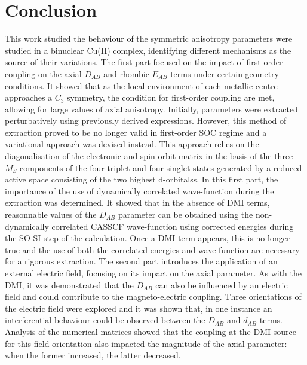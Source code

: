 \documentclass[12pt]{report}
\numberwithin{equation}{section}
\begin{document}
\newpage
\section{Conclusion}

This work studied the behaviour of the symmetric anisotropy parameters were studied in a binuclear Cu(II) complex, identifying different mechanisms as the source of their variations.
The first part focused on the impact of first-order coupling on the axial $D_{AB}$ and rhombic $E_{AB}$ terms under certain geometry conditions.
It showed that as the local environment of each metallic centre approaches a $C_3$ symmetry, the condition for first-order coupling are met, allowing for large values of axial anisotropy.
Initially,  parameters were extracted perturbatively using previously derived expressions. 
However, this method of extraction proved to be no longer valid in first-order SOC regime and a variational approach was devised instead.
This approach relies on the diagonalisation of the electronic and spin-orbit matrix in the basis of the three $M_S$ components of the four triplet and four singlet states generated by a reduced active space consisting of the two highest d-orbitalss.
In this first part, the importance of the use of dynamically correlated wave-function during the extraction was determined.
It showed that in the absence of DMI terms, reasonnable values of the $D_{AB}$ parameter can be obtained using the non-dynamically correlated CASSCF wave-function using corrected energies during the SO-SI step of the calculation.
Once a DMI term appears, this is no longer true and the use of both the correlated energies and wave-function are necessary for a rigorous extraction.
The second part introduces the application of an external electric field, focusing on its impact on the axial parameter.
As with the DMI, it was demonstrated that the $D_{AB}$ can also be influenced by an electric field and could contribute to the magneto-electric coupling.
Three orientations of the electric field were explored and it was shown that, in one instance an interferential behaviour could be observed between the $D_{AB}$ and $d_{AB}$ terms.
Analysis of the numerical matrices showed that the coupling at the DMI source for this field orientation also impacted the magnitude of the axial parameter: when the former increased, the latter decreased.
\end{document}
